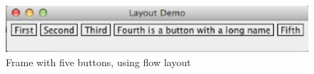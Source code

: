 



\begin {figure}

\includegraphics{figs/ch10/flow1.eps}

\caption {Frame with five buttons, using flow layout}

\label {fig:flow1}

\end {figure}

